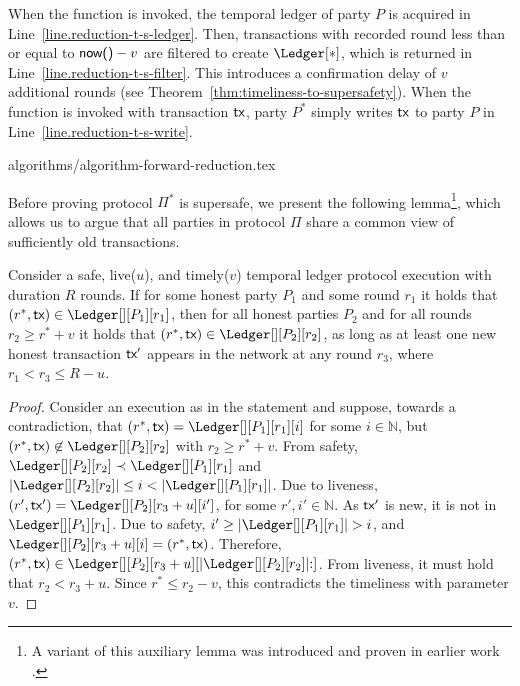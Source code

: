 When the \rread function is invoked, the temporal ledger of party $P$ is acquired
in Line~\ref{line.reduction-t-s-ledger}.
Then, transactions with recorded round less than or equal to $\textsf{now()} - v$ are
filtered to create $\Ledger[*]$, which is returned in Line~\ref{line.reduction-t-s-filter}.
This introduces a confirmation delay of $v$ additional rounds (see Theorem~\ref{thm:timeliness-to-supersafety}).
When the \wwrite function is invoked with transaction $\textsf{tx}$, party $P^*$ simply writes $\textsf{tx}$
to party $P$ in Line~\ref{line.reduction-t-s-write}.

{algorithms/algorithm-forward-reduction.tex}

Before proving protocol $\Pi^*$ is supersafe, we present
the following lemma\footnote{
  A variant of this auxiliary lemma was introduced and proven in earlier work~%
  \ifanonymous%
  \cite{rollerblade-anonymous}%
  \else%
  \cite{rollerblade}%
  \fi%
  .
}, which allows us to argue that all
parties in protocol $\Pi$ share a common view of sufficiently old transactions.



\begin{lemma}\label{lem:past-perfect}
  Consider a safe, live($u$), and timely($v$) temporal ledger protocol
  execution with duration $R$ rounds.
  If for some honest party $P_1$ and some round $r_1$ it holds that
  $(r^*, \tx) \in \Ledger[][P_1][r_1]$, then
  for all honest parties $P_2$ and for all rounds $r_2 \geq r^* + v$
  it holds that $(r^*, \tx) \in \Ledger[][P_2][r_2]$,
  as long as at least one new honest transaction $\textsf{tx}'$ appears in the
  network at any round $r_3$, where $r_1 < r_3 \leq R - u$.
\end{lemma}
\begin{proof}
  Consider an execution as in the statement and suppose, towards a contradiction,
  that $(r^*, \tx) = \Ledger[][P_1][r_1][i]$ for some $i \in \mathbb{N}$,
  but $(r^*, \tx) \not\in \Ledger[][P_2][r_2]$
  with $r_2 \geq r^* + v$.
  From safety,
  $\Ledger[][P_2][r_2] \prec \Ledger[][P_1][r_1]$ and
  $|\Ledger[][P_2][r_2]| \leq i < |\Ledger[][P_1][r_1]|$.
  Due to liveness, $(r', \tx') = \Ledger[][P_2][r_3 + u][i']$,
  for some $r', i' \in \mathbb{N}$.
  As $\textsf{tx}'$ is new, it is not in $\Ledger[][P_1][r_1]$.
  Due to safety, $i' \geq |\Ledger[][P_1][r_1]| > i$, and
  $\Ledger[][P_2][r_3 + u][i] = (r^*, \tx)$.
  Therefore,
  $(r^*, \tx) \in \Ledger[][P_2][r_3 + u][|\Ledger[][P_2][r_2]|{:}]$.
  From liveness, it must hold that $r_2 < r_3 + u$.
  Since $r^* \leq r_2 - v$, this contradicts the timeliness with parameter $v$.\Qed
\end{proof}


